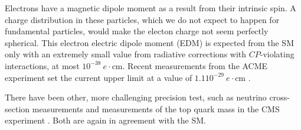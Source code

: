 Electrons have a magnetic dipole moment as a result from their intrinsic spin. A charge distribution in these particles, which we do not expect to happen for fundamental particles, would make the electon charge not seem perfectly spherical. This electron electric dipole moment (EDM) is expected from the SM only with an extremely small value from radiative corrections with $CP$-violating interactions, at most $10^{-38}\ e \cdot \textrm{cm}$. Recent measurements from the ACME experiment set the current upper limit at a value of  $1.1 10^{-29}\ e \cdot \textrm{cm}$ \cite{Cesarotti:2018huy}.

There have been other, more challenging precision test, such as neutrino cross-section measurements \cite{Aartsen:2017kpd} and measurements of the top quark mass in the CMS experiment \cite{Castro:2017yxe}. Both are again in agreement with the SM.


